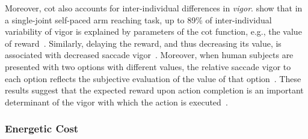Moreover, \gls{cot} also accounts for inter-individual differences in \emph{vigor}\footnotemark.
 show that in a single-joint self-paced arm reaching task, up to 89\% of inter-individual variability of vigor is explained by parameters of the \gls{cot} function, e.g., the value of reward~\cite{Berret2018SciReports}.
Similarly, delaying the reward, and thus decreasing its value, is associated with decreased saccade vigor~\cite{Shadmehr2010Jneurosci}.
Moreover, when human subjects are presented with two options with different values, the relative saccade vigor to each option reflects the subjective evaluation of the value of that option~\cite{Reppert2015JNeurosci}.
These results suggest that the expected reward upon action completion is an important determinant of the vigor with which the action is executed~\cite[see][for a review]{Shadmehr2019TINS}.


\subsubsection{Energetic Cost}